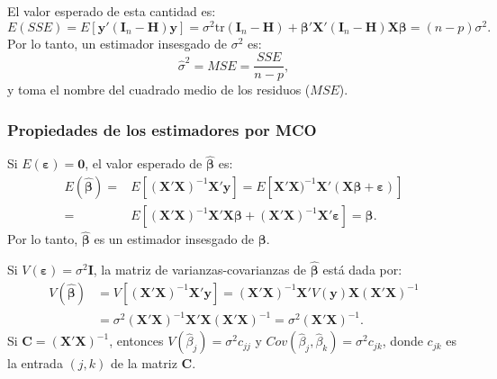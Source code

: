 \documentclass[
]{article}
\begin{document}
El valor esperado de esta cantidad es:
\[
E(SSE) = E\left[\boldsymbol y'(\boldsymbol I_{n} - \boldsymbol H)\boldsymbol y\right] = \sigma^{2}\mbox{tr}\left( \boldsymbol I_{n} - \boldsymbol H\right) + \boldsymbol \beta'\boldsymbol X'(\boldsymbol I_{n} - \boldsymbol H)\boldsymbol X\boldsymbol \beta= (n-p)\sigma^{2}.
\]
Por lo tanto, un estimador insesgado de \(\sigma^2\) es:
\[
\widehat{\sigma}^2 = MSE = \frac{SSE}{n-p},
\]
y toma el nombre del cuadrado medio de los residuos (\(MSE\)).

\subsubsection{Propiedades de los estimadores por MCO}\label{propiedades-de-los-estimadores-por-mco}

Si \(E(\boldsymbol \varepsilon)= \boldsymbol 0\), el valor esperado de \(\widehat{\boldsymbol \beta}\) es:
\begin{equation}
\begin{split}
E(\widehat{\boldsymbol \beta}) =& E\left[ (\boldsymbol X'\boldsymbol X)^{-1}\boldsymbol X'\boldsymbol y\right] = E\left[ \boldsymbol X'\boldsymbol X)^{-1}\boldsymbol X'(\boldsymbol X\boldsymbol \beta+ \boldsymbol \varepsilon) \right] \\
=& E\left[ (\boldsymbol X'\boldsymbol X)^{-1}\boldsymbol X'\boldsymbol X\boldsymbol \beta+ (\boldsymbol X'\boldsymbol X)^{-1}\boldsymbol X'\boldsymbol \varepsilon\right] = \boldsymbol \beta.
\end{split}
\nonumber
\end{equation}
Por lo tanto, \(\widehat{\boldsymbol \beta}\) es un estimador insesgado de \(\boldsymbol \beta\).

Si \(V(\boldsymbol \varepsilon)= \sigma^2\boldsymbol I\), la matriz de varianzas-covarianzas de \(\widehat{\boldsymbol \beta}\) está dada por:
\begin{equation}
\begin{split}
V(\widehat{\boldsymbol \beta}) &= V\left[ (\boldsymbol X'\boldsymbol X)^{-1}\boldsymbol X'\boldsymbol y\right] = (\boldsymbol X'\boldsymbol X)^{-1}\boldsymbol X'V(\boldsymbol y)\boldsymbol X(\boldsymbol X'\boldsymbol X)^{-1}  \\
&= \sigma^{2}(\boldsymbol X'\boldsymbol X)^{-1}\boldsymbol X'\boldsymbol X(\boldsymbol X'\boldsymbol X)^{-1} = \sigma^{2}(\boldsymbol X'\boldsymbol X)^{-1}.
\end{split}
\nonumber
\end{equation}
Si \(\boldsymbol C=(\boldsymbol X'\boldsymbol X)^{-1}\), entonces \(V(\widehat{\beta}_{j}) = \sigma^{2}c_{jj}\) y \(Cov(\widehat{\beta}_{j},\widehat{\beta}_{k})=\sigma^{2}c_{jk}\), donde \(c_{jk}\) es la entrada \((j,k)\) de la matriz \(\boldsymbol C\).
\end{document}
